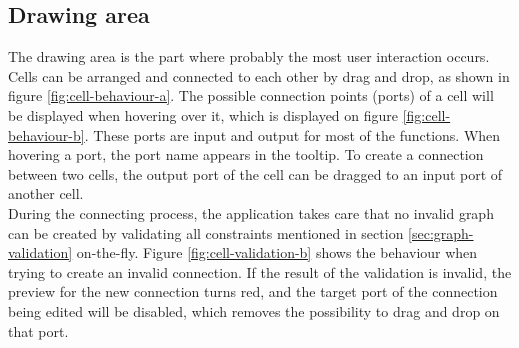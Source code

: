 \documentclass[a4paper,top=25mm,bottom=25mm,12pt,pdftex,halfparskip,twoside,openany,bibtotoc,numbers=noenddot]{scrbook}
\begin{document}
\subsection{Drawing area}

The drawing area is the part where probably the most user interaction occurs.\\ Cells can be arranged and connected to each other by drag and drop, as shown in figure \ref{fig:cell-behaviour-a}.
The possible connection points (ports) of a cell will be displayed when hovering over it, which is displayed on figure \ref{fig:cell-behaviour-b}. These ports are input and output for most of the functions.
When hovering a port, the port name appears in the tooltip.
To create a connection between two cells, the output port of the cell can be dragged to an input port of another cell.\\
During the connecting process, the application takes care that no invalid graph can be created by validating all constraints mentioned in section \ref{sec:graph-validation} on-the-fly. Figure \ref{fig:cell-validation-b} shows the behaviour when trying to create an invalid connection. If the result of the validation is invalid, the preview for the new connection turns red, and the target port of the connection being edited will be disabled, which removes the possibility to drag and drop on that port.
\end{document}
